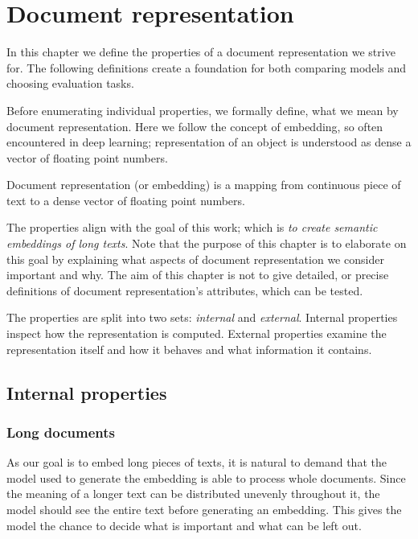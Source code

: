 \chapter{Document representation}

In this chapter we define the properties of a document representation we strive
for. The following definitions create a foundation for both comparing models
and choosing evaluation tasks.

Before enumerating individual properties, we formally define, what we mean by
document representation. Here we follow the concept of embedding, so often
encountered in deep learning; representation of an object is understood as
dense a vector of floating point numbers.

\begin{defn}
  Document representation (or embedding) is a mapping from continuous
  piece of text to a dense vector of floating point numbers.
\end{defn}

The properties align with the goal of this work; which is \emph{to create
semantic embeddings of long texts}. Note that the purpose of this chapter is to
elaborate on this goal by explaining what aspects of document representation we
consider important and why. The aim of this chapter is not to give detailed, or
precise definitions of document representation's attributes, which can be
tested.

The properties are split into two sets: \emph{internal} and \emph{external}.
Internal properties inspect how the representation is computed. External
properties examine the representation itself and how it behaves and what
information it contains.

\section{Internal properties}

\subsection{Long documents}

As our goal is to embed long pieces of texts, it is natural to demand that the
model used to generate the embedding is able to process whole documents. Since
the meaning of a longer text can be distributed unevenly throughout it, the
model should see the entire text before generating an embedding. This gives the
model the chance to decide what is important and what can be left out.


